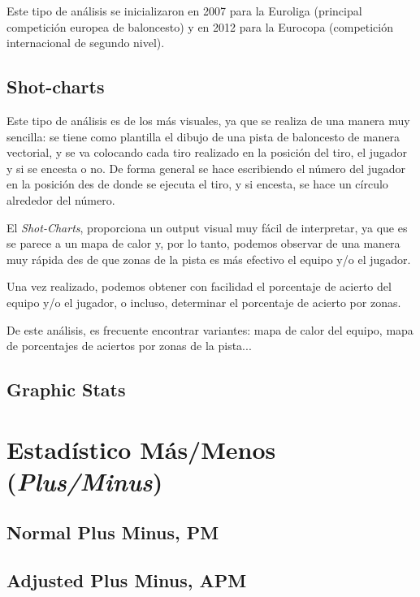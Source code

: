 \documentclass[paper=a4, fontsize=9pt]{article}
\begin{document}
Este tipo de análisis se inicializaron en 2007 para la Euroliga (principal competición europea de baloncesto) y en 2012 para la Eurocopa (competición internacional de segundo nivel).

\clearpage

\subsection{Shot-charts}

Este tipo de análisis es de los más visuales, ya que se realiza de una manera muy sencilla: se tiene como plantilla el dibujo de una pista de baloncesto de manera vectorial, y se va colocando cada tiro realizado en la posición del tiro, el jugador y si se encesta o no. De forma general se hace escribiendo el número del jugador en la posición des de donde se ejecuta el tiro, y si encesta, se hace un círculo alrededor del número.

El \emph{Shot-Charts}, proporciona un output visual muy fácil de interpretar, ya que es se parece a un mapa de calor y, por lo tanto, podemos observar de una manera muy rápida des de que zonas de la pista es más efectivo el equipo y/o el jugador.

Una vez realizado, podemos obtener con facilidad el porcentaje de acierto del equipo y/o el jugador, o incluso, determinar el porcentaje de acierto por zonas.

De este análisis, es frecuente encontrar variantes: mapa de calor del equipo, mapa de porcentajes de aciertos por zonas de la pista...

\subsection{Graphic Stats}




\clearpage

\section{Estadístico Más/Menos (\emph{Plus/Minus})}

\subsection{Normal Plus Minus, PM}

\subsection{Adjusted Plus Minus, APM}
\end{document}
